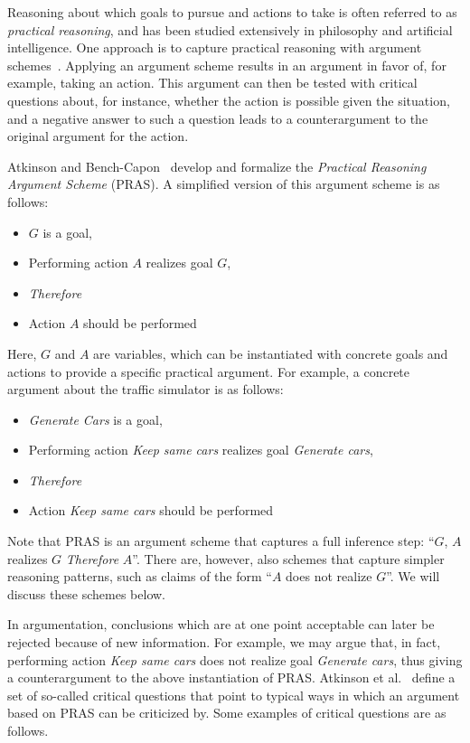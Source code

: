 Reasoning about which goals to pursue and actions to take is often referred to as \emph{practical reasoning}, and has been studied extensively in philosophy and artificial intelligence. One approach is to capture practical reasoning with argument schemes~\cite{walton1990}. Applying an argument scheme results in an argument in favor of, for example, taking an action. This argument can then be tested with critical questions about, for instance, whether the action is possible given the situation, and a negative answer to such a question leads to a counterargument to the original argument for the action. 

Atkinson and Bench-Capon~\cite{atkinson2007} develop and formalize the \emph{Practical Reasoning Argument Scheme} (PRAS). A simplified version of this argument scheme is as follows:

\begin{itemize}
\item[] $G$ is a goal,
\item[] Performing action $A$ realizes goal $G$,
\item[] \textit{Therefore} 
\item[] Action $A$ should be performed
\end{itemize}

Here, $G$ and $A$ are variables, which can be instantiated with concrete goals and actions to provide a specific practical argument. For example, a concrete argument about the traffic simulator is as follows: 
\begin{itemize}
\item[] \emph{Generate Cars} is a goal,
\item[] Performing action \emph{Keep same cars} realizes goal \emph{Generate cars}, 
\item[] \textit{Therefore} 
\item[] Action \emph{Keep same cars} should be performed
\end{itemize}

Note that PRAS is an argument scheme that captures a full inference step: ``$G$, $A$ realizes $G$ \emph{Therefore} $A$''. There are, however, also schemes that capture simpler reasoning patterns, such as claims of the form ``$A$ does not realize $G$''. We will discuss these schemes below. 

In argumentation, conclusions which are at one point acceptable can later be rejected because of new information. For example, we may argue that, in fact, performing action \emph{Keep same cars} does not realize goal \emph{Generate cars}, thus giving a counterargument to the above instantiation of PRAS. Atkinson et al.~\cite{atkinson2007} define a set of so-called critical questions that point to typical ways in which an argument based on PRAS can be criticized by. Some examples of critical questions are as follows.

